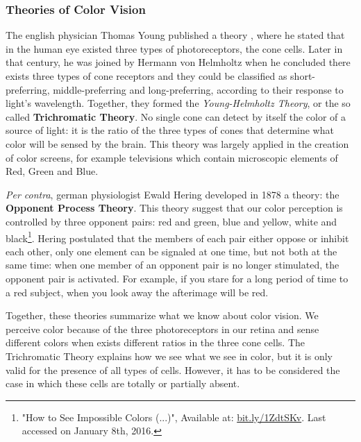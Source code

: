 \subsubsection{Theories of Color Vision}
The english physician Thomas Young published a theory \cite{Young1802}, where he stated that
in the human eye existed three types of photoreceptors, the cone cells. Later in that century, he was
joined by Hermann von Helmholtz when he concluded there exists three types of cone receptors and they could
be classified as short-preferring, middle-preferring and long-preferring, according to their response to
light’s wavelength. Together, they formed the \emph{Young-Helmholtz Theory}, or the so called \textbf{Trichromatic Theory}.
No single cone can detect by itself the color of a source of light: it is the ratio of the three types of cones that
determine what color will be sensed by the brain. This theory was largely applied in the creation of color
screens, for example televisions which contain microscopic elements of Red, Green and Blue. \par
\emph{Per contra}, german physiologist Ewald Hering developed in 1878 a theory: the
\textbf{Opponent Process Theory}. This theory suggest that our color perception is controlled by three
opponent pairs: red and green, blue and yellow, white and black\footnote{"How to See Impossible Colors (...)", Available at: \url{bit.ly/1ZdtSKv}. Last accessed on January 8th, 2016.}. Hering postulated that the members of each
pair either oppose or inhibit each other, only one element can be signaled at one time, but not both at the
same time: when one member of an opponent pair is no longer stimulated, the opponent pair is activated. For
example, if you stare for a long period of time to a red subject, when you look away the afterimage will be
red. \par
Together, these theories summarize what we know about color vision. We perceive color because of the three
photoreceptors in our retina and sense different colors when exists different ratios in the three cone
cells. The Trichromatic Theory explains how we see what we see in color, but it is only valid for the
presence of all types of cells. However, it has to be considered the case in which these cells are totally or partially absent.
%
